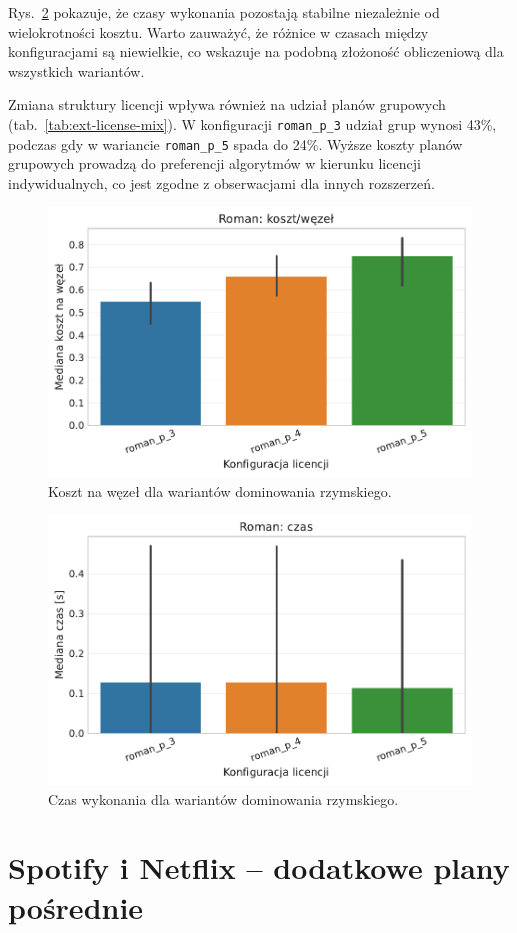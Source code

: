 Rys.~\ref{fig:ext-roman-time} pokazuje, że czasy wykonania pozostają stabilne niezależnie od wielokrotności kosztu. Warto zauważyć, że różnice w czasach między konfiguracjami są niewielkie, co wskazuje na podobną złożoność obliczeniową dla wszystkich wariantów.

Zmiana struktury licencji wpływa również na udział planów grupowych (tab.~\ref{tab:ext-license-mix}). W konfiguracji \texttt{roman\_p\_3} udział grup wynosi 43\%, podczas gdy w wariancie \texttt{roman\_p\_5} spada do 24\%. Wyższe koszty planów grupowych prowadzą do preferencji algorytmów w kierunku licencji indywidualnych, co jest zgodne z obserwacjami dla innych rozszerzeń.

\begin{figure}[H]
  \centering
  \includegraphics[width=0.6\linewidth]{assets/figures/extensions/static/roman_cost_per_node_comparison.pdf}
  \caption{Koszt na węzeł dla wariantów dominowania rzymskiego.}
  \label{fig:ext-roman-cost}
\end{figure}

\begin{figure}[H]
  \centering
  \includegraphics[width=0.6\linewidth]{assets/figures/extensions/static/roman_time_comparison.pdf}
  \caption{Czas wykonania dla wariantów dominowania rzymskiego.}
  \label{fig:ext-roman-time}
\end{figure}

\section{Spotify i Netflix -- dodatkowe plany pośrednie}


